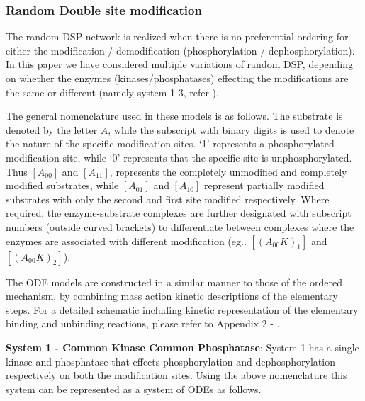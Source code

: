 \documentclass[9pt,lineno]{elife}
\begin{document}
\begin{appendixbox}
\subsubsection*{Random Double site modification}

The random DSP network is realized when there is no preferential ordering for either the modification / demodification (phosphorylation / dephosphorylation). In this paper we have considered multiple variations of random DSP, depending on whether the enzymes (kinases/phosphatases) effecting the modifications are the same or different (namely system 1-3, refer ). 

The general nomenclature used in these models is as follows. The substrate is denoted by the letter $A$, while the subscript with binary digits is used to denote the nature of the specific modification sites. `1' represents a phosphorylated modification site, while `0' represents that the specific site is unphosphorylated. Thus $[A_{00}]$ and $[A_{11}]$, represents the completely unmodified and completely modified substrates, while $[A_{01}]$ and $[A_{10}]$ represent partially modified substrates with only the second and first site modified respectively. Where required,  the enzyme-substrate complexes are further designated with subscript numbers (outside curved brackets) to differentiate between complexes where the enzymes are 
associated with  different modification  (eg.. $[(A_{00}K)_1]$ and $[(A_{00}K)_2]$). 

The ODE models are constructed in a similar manner to those of the ordered mechanism, by combining mass action kinetic descriptions of the elementary steps. For a detailed schematic including kinetic representation of the elementary binding and unbinding reactions, please refer to Appendix 2 - . 

\textbf{System 1 - Common Kinase Common Phosphatase}: System 1 has a single kinase and phosphatase that effects phosphorylation and dephosphorylation respectively on both the modification sites. Using the above nomenclature this system can be represented as a system of ODEs as follows. 


\end{appendixbox}
\end{document}
